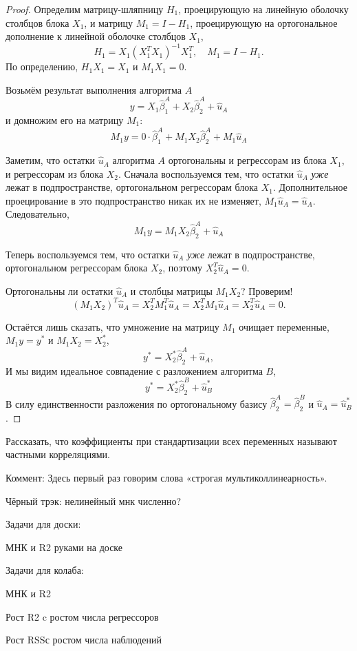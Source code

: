 \documentclass[12pt]{article}
\newcommand{\hb}{\hat{\beta}}
\newcommand{\hu}{\hat{u}}
\newcommand{\RSS}{RSS}
\begin{document}
\begin{proof}
Определим матрицу-шляпницу $H_1$, проецирующую на линейную оболочку столбцов блока $X_1$, и матрицу $M_1 = I - H_1$, проецирующую на ортогональное дополнение к линейной оболочке столбцов $X_1$,
\[
H_1 = X_1(X_1^TX_1)^{-1}X_1^T, \quad M_1 = I - H_1.
\]
По определению, $H_1 X_1 = X_1$ и $M_1 X_1 = 0$.

Возьмём результат выполнения алгоритма $A$
\[
y = X_1 \hb_1^A + X_2 \hb_2^A + \hu_A
\]
и домножим его на матрицу $M_1$:
\[
M_1 y = 0 \cdot \hb_1^A + M_1 X_2 \hb_2^A + M_1 \hu_A
\]

Заметим, что остатки $\hu_A$ алгоритма $A$ ортогональны и регрессорам из блока $X_1$, и регрессорам из блока $X_2$. 
Сначала воспользуемся тем, что остатки $\hu_A$ \emph{уже} лежат в подпространстве, ортогональном регрессорам блока $X_1$. 
Дополнительное проецирование в это подпространство никак их не изменяет, $M_1 \hu_A  = \hu_A$.
Следовательно,
\[
M_1 y  = M_1 X_2 \hb_2^A + \hu_A
\]

Теперь воспользуемся тем, что остатки $\hu_A$ \emph{уже} лежат в подпространстве, ортогональном регрессорам блока $X_2$, поэтому $X_2^T \hu_A = 0$.

Ортогональны ли остатки $\hu_A$ и столбцы матрицы $M_1 X_2$? Проверим!
\[
(M_1 X_2)^T \hu_A = X_2^T M_1^T \hu_A = X_2^T M_1 \hu_A = X_2^T \hu_A = 0.
\]

Остаётся лишь сказать, что умножение на матрицу $M_1$ очищает переменные, $M_1 y = y^*$ и $M_1 X_2 = X_2^*$,
\[
y^* = X_2^* \hb_2^A + \hu_A,
\]
И мы видим идеальное совпадение с разложением алгоритма $B$,
\[
y^* = X_2^* \hb_2^B + \hu^*_B
\]
В силу единственности разложения по ортогональному базису $\hb_2^A = \hb_2^B$ и $\hu_A = \hu^*_B$.
\end{proof}
 
Рассказать, что коэффициенты при стандартизации всех переменных называют частными корреляциями. 

Коммент: Здесь первый раз говорим слова «строгая мультиколлинеарность».

Чёрный трэк: нелинейный мнк численно?

Задачи для доски:

МНК и R2 руками на доске

Задачи для колаба:

МНК и R2

Рост R2 c ростом числа регрессоров

Рост \RSS с ростом числа наблюдений

\end{document}
